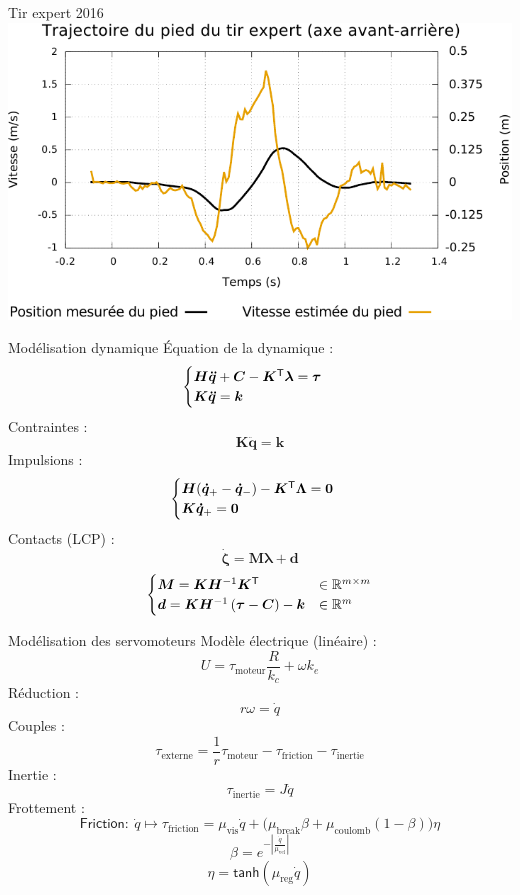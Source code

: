 \begin{frame}[noframenumbering]{Tir expert 2016}
    \centering
    \includegraphics[type=pdf,ext=.pdf,read=.pdf,width=1.0\linewidth]{../plot/kickgreg_vel}
\end{frame}

\begin{frame}[noframenumbering]{Modélisation dynamique}
    Équation de la dynamique :
    $$
    \begin{cases}
    \bm{H}\bm{\ddot{q}} + \bm{C} - \bm{K}^{\mathsf{T}}\bm{\lambda} = \bm{\tau} \\
    \bm{K}\bm{\ddot{q}} = \bm{k}
    \end{cases}
    $$
    Contraintes :
    $$
    \bm{K}\bm{\ddot{q}} = \bm{k}
    $$
    Impulsions :
    $$
    \begin{cases}
        \bm{H}(\bm{\dot{q}}_{+}-\bm{\dot{q}}_{-}) - \bm{K}^{\mathsf{T}}\bm{\Lambda} = \bm{0} \\
    \bm{K}\bm{\dot{q}}_{+} = \bm{0} \\
    \end{cases}
    $$
    Contacts (LCP) :
    $$
    \dot{\bm{\zeta}} = \bm{M}\bm{\lambda} + \bm{d}
    $$
    $$
    \begin{cases}
    \bm{M} = \bm{K}\bm{H}^{-1}\bm{K}^{\mathsf{T}} & \in \mathbb{R}^{m \times m}\\
    \bm{d} = \bm{K}\bm{H}^{-1}\left(\bm{\tau} - \bm{C}\right) - \bm{k} & \in \mathbb{R}^{m}\\
    \end{cases}
    $$
\end{frame}

\begin{frame}[noframenumbering]{Modélisation des servomoteurs}
    Modèle électrique (linéaire) :
    $$
    U = \tau_{\text{moteur}} \frac{R}{k_{c}} + \omega k_{e}
    $$
    Réduction :
    $$
    r \omega = \dot{q}
    $$
    Couples :
    $$
    \tau_{\text{externe}} = \frac{1}{r} \tau_{\text{moteur}} - \tau_{\text{friction}} - \tau_{\text{inertie}}
    $$
    Inertie :
    $$
    \tau_{\text{inertie}} = J \ddot{q}
    $$
    Frottement :
    $$
    \mathsf{Friction} :~ \dot{q}
    \longmapsto 
    \tau_{\text{friction}}
    =
    \mu_{\text{vis}} \dot{q} 
    + \big( 
    \mu_{\text{break}} \beta 
    + \mu_{\text{coulomb}} (1-\beta) \big) 
    \eta
    $$
    $$
    \beta = e^{-|\frac{\dot{q}}{\mu_{\text{vel}}}|}
    $$
    $$
    \eta = \mathsf{tanh}(\mu_{\text{reg}}\dot{q})
    $$
\end{frame}

